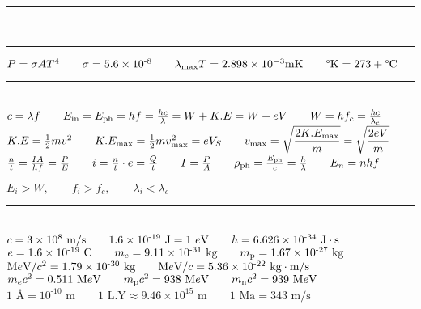 \documentclass[a4paper,12pt]{article}
\newcommand{\sz}{\text{-}}
\begin{document}
{\centering \rule{10cm}{0.8pt}\\\rule[\dimexpr \ht\strutbox+0.1cm]{7cm}{0.8pt} \par}

\noindent
$P = \sigma AT^4 \qquad \sigma = 5.6 \times 10^{\sz8} \qquad \lambda_{\text{max}} T = 2.898 \times 10^{-3} \text{mK} \qquad \degree \text{K} = 273 + \degree \text{C}$

{\centering \rule{10cm}{0.4pt} \par}

\ \\
\noindent
$ c = \lambda f \qquad E_{\text{in}} = E_{\text{ph}} = hf = \frac{hc}{\lambda} = W + K.E = W + eV \qquad W = h f_c = \frac{hc}{\lambda_c} \\[+2mm]$
$ K.E = \frac{1}{2} mv^2 \qquad K.E_{\text{max}} = \frac{1}{2} m v^2_{\text{max}} = eV_S \qquad v_{\text{max}} = \sqrt{\displaystyle \frac{2K.E_{\text{max}}}{m}} = \sqrt{\displaystyle \frac{2eV}{m}}\\[+2mm]$
$ \frac{n}{t} = \frac{IA}{hf} = \frac{P}{E} \qquad i = \frac{n}{t} \cdot e = \frac{Q}{t} \qquad I = \frac{P}{A} \qquad \rho_{\text{ph}} = \frac{E_\text{ph}}{c} = \frac{h}{\lambda} \qquad E_n = n hf \\$
\begin{center}
    $E_i > W, \qquad f_i > f_c, \qquad \lambda_i < \lambda_c$
\end{center}

{\centering \rule{10cm}{0.4pt} \par}

\ \\
\noindent
$c = 3 \times 10^8 \text{ m}/\text{s} \qquad 1.6\times 10^{\sz 19}\text{ J} = 1 \ e\text{V} \qquad h = 6.626 \times 10^{\sz34} \text{ J} \cdot \text{s}\\[+2mm]$
$e = 1.6 \times 10^{\sz 19} \text{ C} \qquad m_{e} = 9.11 \times 10^{\sz31} \text{ kg} \qquad m_{\text{p}} = 1.67 \times 10^{\sz27} \text{ kg}\\[+2mm]$
$\text{M}e\text{V}/c^2 = 1.79 \times 10^{\sz30} \text{ kg} \qquad \text{M}e\text{V}/c = 5.36 \times 10^{\sz22} \text{ kg}\cdot\text{m}/\text{s}\\[+2mm]$
$m_e c^2 = 0.511 \text{ M}e\text{V} \qquad m_\text{p}c^2 = 938 \text{ M}e\text{V} \qquad m_\text{n}c^2 = 939 \text{ M}e\text{V} \\[+2mm]$
$ 1 \text{ \AA} = 10^{\sz10} \text{ m} \qquad 1 \text{ L.Y} \approx 9.46 \times 10^{15} \text{ m} \qquad 1 \text{ Ma} = 343 \text{ m}/\text{s}$
\end{document}
